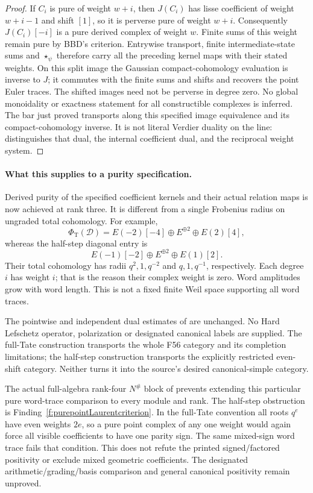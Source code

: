 \begin{proof}
If \(C_i\) is pure of weight \(w+i\), then \(J(C_i)\)
has lisse coefficient of weight \(w+i-1\) and shift
\([1]\), so it is perverse pure of weight \(w+i\).
Consequently \(J(C_i)[-i]\) is a pure derived complex
of weight \(w\). Finite sums of this weight remain pure
by BBD's criterion.
Entrywise transport, finite intermediate-state sums
and \(\star_\psi\) therefore carry all the preceding
kernel maps with their stated weights.
On this split image the Gaussian compact-cohomology
evaluation is inverse to \(J\); it commutes with the
finite sums and shifts and recovers the point Euler
traces.
The shifted images need not be perverse in degree zero.
No global monoidality or exactness statement for all
constructible complexes is inferred.
The bar just proved transports along this specified
image equivalence and its compact-cohomology inverse.
It is not literal Verdier duality on the line:
 distinguishes that dual, the internal
coefficient dual, and the reciprocal weight system.
\end{proof}

\paragraph{What this supplies to a purity specification.}
Derived purity of the specified coefficient kernels
and their actual relation maps is now achieved at
rank three. It is different from a single Frobenius
radius on ungraded total cohomology. For example,
\[
 \Phi_{\mathrm T}(\mathcal D)
    =E(-2)[-4]\oplus E^{\oplus2}\oplus E(2)[4],
\]
whereas the half-step diagonal entry is
\[
       E(-1)[-2]\oplus E^{\oplus2}\oplus E(1)[2].
\]
Their total cohomology has radii \(q^2,1,q^{-2}\)
and \(q,1,q^{-1}\), respectively. Each degree \(i\)
has weight \(i\); that is the reason their complex
weight is zero. Word amplitudes grow with word length.
This is not a fixed finite Weil space supporting
all word traces.

The pointwise and independent dual estimates of
 are unchanged. No Hard Lefschetz operator,
polarization or designated canonical labels are
supplied. The full-Tate construction transports the
whole F56 category and its completion limitations;
the half-step construction transports the explicitly
restricted even-shift category. Neither turns it into
the source's desired canonical-simple category.

The actual full-algebra rank-four \(N^\#\) block of
 prevents extending this particular pure
word-trace comparison to every module and rank.
The half-step obstruction is
Finding~\ref{f:purepointLaurentcriterion}.
In the full-Tate convention all roots \(q^e\) have
even weights \(2e\), so a pure point complex of any
one weight would again force all visible coefficients
to have one parity sign. The same mixed-sign word
trace fails that condition.
This does not refute the printed signed/factored
positivity or exclude mixed geometric coefficients.
The designated arithmetic/grading/basis comparison
and general canonical positivity remain unproved.


